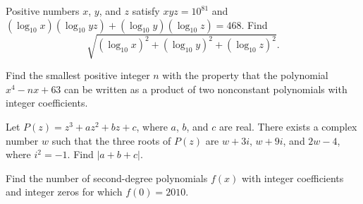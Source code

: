 \documentclass[11pt]{article}
\theoremstyle{definition}
\begin{document}
\begin{question}[name={2010 AIME II, \href{https://artofproblemsolving.com/community/c4p1831597}{Problem 5}}]
	Positive numbers $ x$, $ y$, and $ z$ satisfy $ xyz = 10^{81}$ and $ (\log_{10}x)(\log_{10} yz) + (\log_{10}y) (\log_{10}z) = 468$. Find $$ \sqrt {(\log_{10}x)^2 + (\log_{10}y)^2 + (\log_{10}z)^2}.$$	
\end{question}


%	













\begin{question}[name={2010 AIME II, \href{https://artofproblemsolving.com/community/c4p1831598}{Problem 6}}]
	Find the smallest positive integer $ n$ with the property that the polynomial $ x^4 - nx + 63$ can be written as a product of two nonconstant polynomials with integer coefficients.
\end{question}


%	












\begin{question}[name={2010 AIME II, \href{https://artofproblemsolving.com/community/c4p1831732}{Problem 7}}]
	Let $ P(z) = z^3 + az^2 + bz + c$, where $ a$, $ b$, and $ c$ are real. There exists a complex number $ w$ such that the three roots of $ P(z)$ are $ w + 3i$, $ w + 9i$, and $ 2w - 4$, where $ i^2 = - 1$. Find $|a + b + c|$.
\end{question}


%	












\begin{question}[name={2010 AIME II, \href{https://artofproblemsolving.com/community/c4p1831336}{Problem 10}}]
	Find the number of second-degree polynomials $ f(x)$ with integer coefficients and integer zeros for which $ f(0)=2010$.
\end{question}
\end{document}
